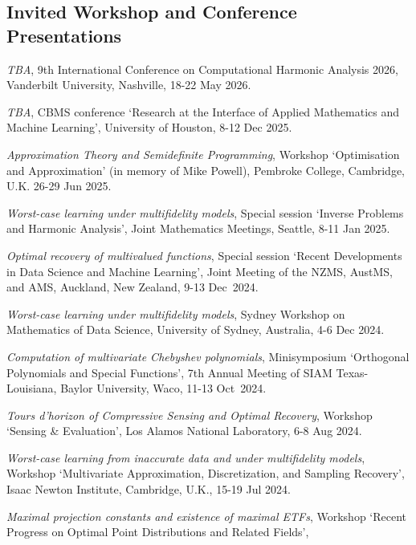 \documentclass[11pt]{article}
\begin{document}
\subsection{Invited Workshop and Conference Presentations}
\bitemize 
\item {\sl TBA}, 
9th International Conference on Computational Harmonic Analysis 2026, Vanderbilt University, Nashville, 18-22 May 2026.
\item {\sl TBA},
CBMS conference `Research at the Interface of Applied Mathematics and Machine Learning',
University of Houston,
8-12 Dec 2025.
\item {\sl Approximation Theory and Semidefinite Programming}, Workshop `Optimisation and Approximation'
(in memory of Mike Powell),
Pembroke College, Cambridge, U.K. 
26-29 Jun 2025.
\item {\sl Worst-case learning under multifidelity models}, Special session `Inverse Problems and Harmonic Analysis', Joint Mathematics Meetings, Seattle, 8-11 Jan 2025. 
\item {\sl Optimal recovery of multivalued functions},
Special session `Recent Developments in Data Science and Machine Learning', 
Joint Meeting of the NZMS, AustMS, and AMS, Auckland, New Zealand, 9-13 Dec~2024.
\item {\sl Worst-case learning under multifidelity models},
Sydney Workshop on Mathematics of Data Science,
University of Sydney, Australia, 4-6 Dec 2024.
\item {\sl Computation of multivariate Chebyshev polynomials}, 
Minisymposium  `Orthogonal Polynomials and Special Functions',
7th Annual Meeting of SIAM Texas-Louisiana,
Baylor University, Waco, 11-13 Oct~2024.
\item {\sl Tours d’horizon of Compressive Sensing and Optimal Recovery},
Workshop `Sensing \& Evaluation', Los Alamos National Laboratory, 6-8 Aug 2024.
\item {\sl Worst-case learning from inaccurate data and under multifidelity models},
Workshop `Multivariate Approximation, Discretization, and Sampling Recovery',
Isaac Newton Institute, Cambridge, U.K., 15-19 Jul 2024.
\item {\sl Maximal projection constants and existence of maximal ETFs},
Workshop `Recent Progress on Optimal Point Distributions and Related Fields',
\end{document}
